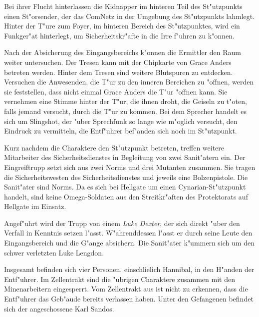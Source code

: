 Bei ihrer Flucht hinterlassen die Kidnapper im hinteren Teil des St"utzpunkts einen St"orsender, der das ComNetz in der Umgebung des St"utzpunkts lahmlegt. Hinter der T"ure zum Foyer, im hinteren Bereich des St"utzpunktes, wird ein Funkger"at hinterlegt, um Sicherheitskr"afte in die Irre f"uhren zu k"onnen.


Nach der Absicherung des Eingangsbereichs k"onnen die Ermittler den Raum weiter untersuchen. Der Tresen kann mit der Chipkarte von Grace Anders betreten werden. Hinter dem Tresen sind weitere Blutspuren zu entdecken. Versuchen die Anwesenden, die T"ur zu den inneren Bereichen zu "offnen, werden sie feststellen, dass nicht einmal Grace Anders die T"ur "offnen kann. Sie vernehmen eine Stimme hinter der T"ur, die ihnen droht, die Geiseln zu t"oten, falls jemand versucht, durch die T"ur zu kommen. Bei dem Sprecher handelt es sich um Slingshot, der "uber Sprechfunk so lange wie m"oglich versucht, den Eindruck zu vermitteln, die Entf"uhrer bef"anden sich noch im St"utzpunkt.

Kurz nachdem die Charaktere den St"utzpunkt betreten, treffen weitere Mitarbeiter des Sicherheitsdienstes in Begleitung von zwei Sanit"atern ein. Der Eingreiftrupp setzt sich aus zwei Norms und drei Mutanten zusammen. Sie tragen die Sicherheitswesten des Sicherheitsdienstes und jeweils eine Bolzenpistole. Die Sanit"ater sind Norms. Da es sich bei Hellgate um einen Cynarian-St"utzpunkt handelt, sind keine Omega-Soldaten aus den Streitkr"aften des Protektorats auf Hellgate im Einsatz. 

Angef"uhrt wird der Trupp von einem \emph{Luke Dexter}, der sich direkt "uber den Verfall in Kenntnis setzen l"asst. W"ahrenddessen l"asst er durch seine Leute den Eingangsbereich und die G"ange absichern. Die Sanit"ater k"ummern sich um den schwer verletzten Luke Lengdon.


Insgesamt befinden sich vier Personen, einschlie\3lich Hannibal, in den H"anden der Entf"uhrer. Im Zellentrakt sind die "ubrigen Charaktere zusammen mit den Minenarbeitern eingesperrt. Vom Zellentrakt aus ist nicht zu erkennen, dass die Entf"uhrer das Geb"aude bereits verlassen haben. Unter den Gefangenen befindet sich der angeschossene Karl Sandos. 

